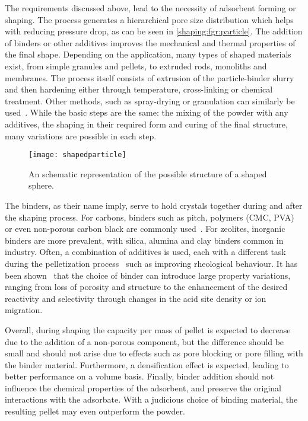 The requirements discussed above, lead to the necessity of adsorbent
forming or shaping. The process generates a hierarchical pore size 
distribution which helps with reducing pressure drop, as can be
seen in \autoref{shaping:fgr:particle}. The addition of 
binders or other additives improves the mechanical and thermal
properties of the final shape. Depending on the application,
many types of shaped materials exist, from simple granules and 
pellets, to extruded rods, monoliths and membranes.
The process itself consists of extrusion of the particle-binder slurry 
and then hardening either through temperature, cross-linking
or chemical treatment. Other methods, such as spray-drying or 
granulation can similarly be 
used~\cite{ruthvenPrinciplesAdsorptionAdsorption1984}.
While the basic steps are the same: the mixing of the powder with any
additives, the shaping in their required form and curing of the final
structure, many variations are possible in each step.

\begin{figure}[!htb]
	\centering
	\texttt{[image: shapedparticle]}
	\caption{An schematic representation of the possible structure
	of a shaped sphere.}%
	\label{shaping:fgr:particle}
\end{figure}

The binders, as their name imply, serve to hold crystals together
during and after the shaping process.
For carbons, binders such as pitch, polymers (CMC, PVA) or 
even non-porous carbon black are 
commonly used~\cite{ohjiAdvancedProcessingManufacturing2008}.
For zeolites, inorganic binders are more prevalent, with silica, 
alumina and clay binders common in industry. 
Often, a combination of additives is used, each with a different task 
during the pelletization process~\cite{bandoszActivatedCarbonSurfaces2006}
such as improving rheological behaviour. It has been 
shown~\cite{whitingcuriouscasezeolite2016, MichelsEffectsBindersPerformance2014}
that the choice of binder can introduce large property variations, ranging 
from loss of porosity and structure to the enhancement of the desired
reactivity and selectivity through changes in the acid site density 
or ion migration.

Overall, during shaping the capacity per mass of pellet is expected to 
decrease due to the addition of a non-porous component, but the
difference should be small and should not arise due to effects 
such as pore blocking or pore filling with the binder material.
Furthermore, a densification effect is expected, leading to
better performance on a volume basis.
Finally, binder addition should not influence the chemical properties 
of the adsorbent, and preserve the original interactions with the adsorbate.
With a judicious choice of binding material, the resulting pellet
may even outperform the powder.

